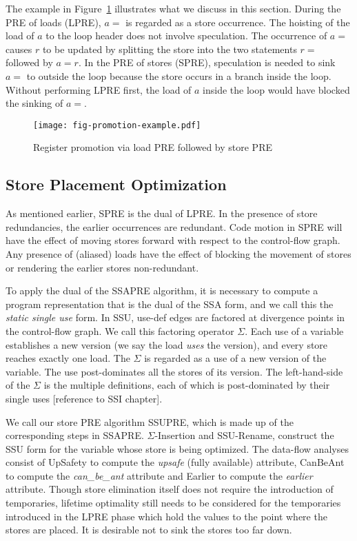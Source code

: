 The example in Figure~\ref{fig:promotion-example} illustrates what we discuss
in this section.  During the PRE of loads (LPRE), $a =$ is regarded as a
store occurrence.  The hoisting of the load of $a$ to the loop header does
not involve speculation. The occurrence of $a =$ causes $r$ to be updated
by splitting the store into the two statements $r =$ followed by $a = r$.  In 
the PRE of stores (SPRE), speculation is needed to sink $a =$ to outside the
loop because the store occurs in a branch inside the loop.  Without performing 
LPRE first, the load of $a$ inside the loop would
have blocked the sinking of $a =$.

\begin{figure}
\centering
\texttt{[image: fig-promotion-example.pdf]}
\caption{Register promotion via load PRE followed by store PRE}
\label{fig:promotion-example}
\end{figure}

\subsection{Store Placement Optimization}

As mentioned earlier, SPRE is the dual of LPRE.
In the presence of store redundancies, the earlier occurrences are redundant.
Code motion in SPRE will have the effect of moving stores forward with respect 
to the control-flow graph.  Any presence of (aliased) loads have the effect of
blocking the movement of stores or rendering the earlier stores non-redundant.

To apply the dual of the SSAPRE algorithm, it is necessary to compute a program
representation that is the dual of the SSA form, and we call this the 
\emph{static single use} form.  In SSU, use-def edges are factored at
divergence points in the control-flow graph.  We call this factoring operator
$\Sigma$.  Each use of a variable establishes a new version (we say the load 
\emph{uses} the version), and every store reaches exactly one load.   The
$\Sigma$ is regarded as a use of a new version of the variable.  The use
post-dominates all the stores of its version.  The left-hand-side of the
$\Sigma$ is the multiple definitions, each of which is post-dominated by their
single uses [reference to SSI chapter].

We call our store PRE algorithm SSUPRE, which is made up of the corresponding 
steps in SSAPRE.   $\Sigma$-Insertion and
SSU-Rename, construct the SSU form for the variable whose store is being 
optimized.  The data-flow analyses consist of UpSafety to compute the
\emph{upsafe} (fully available) attribute, CanBeAnt to compute the
\emph{can\_be\_ant} attribute and Earlier to compute the \emph{earlier}
attribute.  Though store elimination itself does not require
the introduction of temporaries, lifetime optimality still needs to be
considered for the temporaries introduced in the LPRE phase which hold the 
values to the point where the stores are placed.  It is desirable not 
to sink the stores too far down.  

